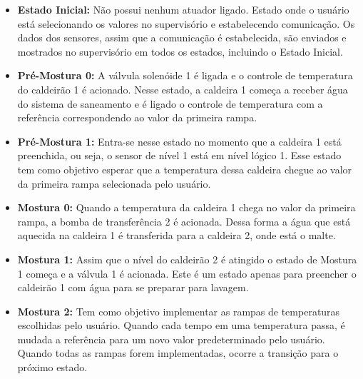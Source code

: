 \begin{itemize}
	   \item \textbf{Estado Inicial:} Não possui nenhum atuador ligado. Estado onde o usuário está selecionando os valores no supervisório e estabelecendo comunicação. Os dados dos sensores, assim que a comunicação é estabelecida, são enviados e mostrados no supervisório em todos os estados, incluindo o Estado Inicial. 
\end{itemize}

\begin{itemize}
	   \item \textbf{Pré-Mostura 0:} A válvula solenóide 1 é ligada e o controle de temperatura do caldeirão 1 é acionado. Nesse estado, a caldeira 1 começa a receber água do sistema de saneamento e é ligado o controle de temperatura com a referência correspondendo ao valor da primeira rampa. 
\end{itemize}

\begin{itemize}
	   \item \textbf{Pré-Mostura 1:} Entra-se nesse estado no momento que a caldeira 1 está preenchida, ou seja, o sensor de nível 1 está em nível lógico 1. Esse estado tem como objetivo esperar que a temperatura dessa caldeira chegue ao valor da primeira rampa selecionada pelo usuário.
\end{itemize}

\begin{itemize}
	   \item \textbf{Mostura 0:} Quando a temperatura da caldeira 1 chega no valor da primeira rampa, a bomba de transferência 2 é acionada. Dessa forma a água que está aquecida na caldeira 1 é transferida para a caldeira 2, onde está o malte.
\end{itemize}

\begin{itemize}
	   \item \textbf{Mostura 1:} Assim que o nível do caldeirão 2 é atingido o estado de Mostura 1 começa e a válvula 1 é acionada. Este é um estado apenas para preencher o caldeirão 1 com água para se preparar para lavagem. 
\end{itemize}

\begin{itemize}
	   \item \textbf{Mostura 2:} Tem como objetivo implementar as rampas de temperaturas escolhidas pelo usuário. Quando cada tempo em uma temperatura passa, é mudada a referência para um novo valor predeterminado pelo usuário. Quando todas as rampas forem implementadas, ocorre a transição para o próximo estado.
\end{itemize}

